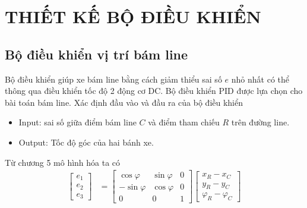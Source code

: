 \chapter{THIẾT KẾ BỘ ĐIỀU KHIỂN}
     \section{Bộ điều khiển vị trí bám line}
          \hspace*{0.6cm}Bộ điều khiển giúp xe bám line bằng cách giảm thiểu sai số $e$ nhỏ nhất có thể thông qua điều khiển tốc độ 2 động cơ DC. Bộ điều khiển PID được lựa chọn cho bài toán bám line.
          \newline
          \hspace*{0.6cm}Xác định đầu vào và đầu ra của bộ điều khiển
          \begin{itemize}
               \item Input: sai số giữa điểm bám line $C$ và điểm tham chiếu $R$ trên đường line.
               \item Output: Tốc độ góc của hai bánh xe.
          \end{itemize}
          \hspace*{0.6cm}Từ chương 5 mô hình hóa ta có
          \begin{align}
               \begin{bmatrix}
                    e_1 \\
                    e_2 \\
                    e_3
                    \end{bmatrix} &= \begin{bmatrix}
                    \cos\varphi & \sin \varphi & 0 \\
                    -\sin\varphi & \cos \varphi & 0 \\
                    0 & 0 & 1
                    \end{bmatrix} \begin{bmatrix}
                    x_R - x_C \\
                    y_R - y_C \\
                    \varphi_R - \varphi_C
               \end{bmatrix} 
               \label{c6_e1}
          \end{align}
